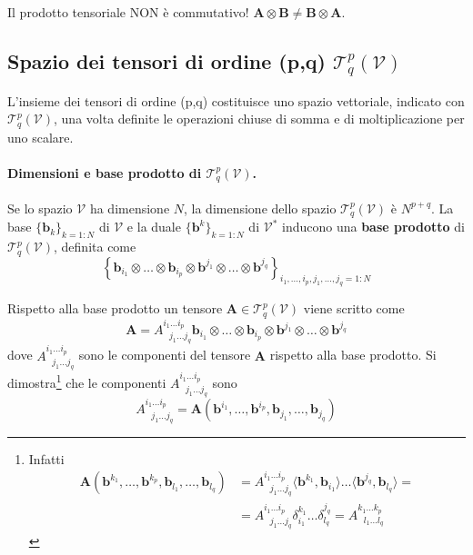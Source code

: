  \noindent
 Il prodotto tensoriale NON è commutativo! $\bm{A} \otimes \bm{B} \neq \bm{B} \otimes \bm{A}$.

  \subsection{Spazio dei tensori di ordine (p,q) $\mathcal{T}^p_q(\mathcal{V})$}
 
 L'insieme dei tensori di ordine (p,q) costituisce uno spazio vettoriale, indicato con $\mathcal{T}^p_q(\mathcal{V})$,
 una volta definite le operazioni chiuse di somma e di moltiplicazione per uno scalare.
 
 \paragraph{Dimensioni e base prodotto di $\mathcal{T}^p_q(\mathcal{V})$.} Se lo spazio $\mathcal{V}$
 ha dimensione $N$, la dimensione dello spazio $\mathcal{T}^p_q(\mathcal{V})$ è $N^{p+q}$.
 La base $\{ \bm{b}_k \}_{k=1:N}$ di $\mathcal{V}$ e la duale $\{ \bm{b}^k \}_{k=1:N}$ di $\mathcal{V}^*$
 inducono una \textbf{base prodotto} di $\mathcal{T}^p_q(\mathcal{V})$, definita come
\begin{equation}
  \left\{ \bm{b}_{i_1} \otimes \dots \otimes \bm{b}_{i_p} \otimes \bm{b}^{j_1} \otimes \dots \otimes \bm{b}^{j_q}   \right\}_{
  i_1,\dots,i_p,j_1,\dots,j_q = 1 : N}
\end{equation}

\noindent
 Rispetto alla base prodotto un tensore $\bm{A} \in \mathcal{T}^p_q(\mathcal{V})$ viene scritto come
 \begin{equation}
  \bm{A} = A^{i_1 \dots i_p}_{\ \ \ j_1 \dots j_q} \bm{b}_{i_1} \otimes \dots \otimes \bm{b}_{i_p} \otimes
     \bm{b}^{j_1} \otimes \dots \otimes \bm{b}^{j_q}
 \end{equation}
 dove $A^{i_1 \dots i_p}_{\ \ \ j_1 \dots j_q}$ sono le componenti del tensore $\bm{A}$ rispetto alla base prodotto.
 Si dimostra\footnote{Infatti
 \begin{equation}
 \begin{aligned}
   \bm{A}(\bm{b}^{k_1},\dots,\bm{b}^{k_p},\bm{b}_{l_1},\dots,\bm{b}_{l_q}) & =
     A^{i_1 \dots i_p}_{\ \ \ j_1 \dots j_q} \langle \bm{b}^{k_1}, \bm{b}_{i_1} \rangle  \dots \langle \bm{b}^{j_q}, \bm{b}_{l_q} \rangle = \\
     & = A^{i_1 \dots i_p}_{\ \ \ j_1 \dots j_q} \delta^{k_1}_{i_1} \dots \delta^{j_q}_{l_q} = A^{k_1 \dots k_p}_{\ \ \ l_1 \dots l_q}
 \end{aligned}
 \end{equation}
 } che le componenti $A^{i_1 \dots i_p}_{\ \ \ j_1 \dots j_q}$ sono
 \begin{equation}
   A^{i_1 \dots i_p}_{\ \ \ j_1 \dots j_q} = \bm{A}(\bm{b}^{i_1},\dots,\bm{b}^{i_p},\bm{b}_{j_1},\dots,\bm{b}_{j_q})
 \end{equation}
 
